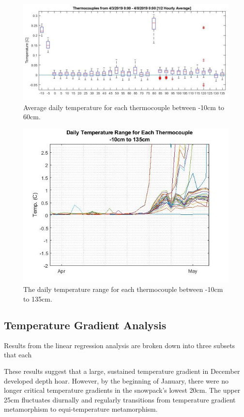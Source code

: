 \begin{figure}[H]
    \raggedleft
    \includegraphics[width=1\linewidth]{figures/Isotherm_boxplot.jpg}
    \caption{Average daily temperature for each thermocouple between -10cm to 60cm.}
    \label{fig:IsothermBoxplot}
 \end{figure}
 
 \begin{figure}[H]
    \centering
    \includegraphics[width=0.8\linewidth]{figures/DailyTempRange_Isotherm.jpg}
    \caption{The daily temperature range for each thermocouple between -10cm to 135cm.}
    \label{fig:DailyTempRange}
 \end{figure}
 
\subsection{Temperature Gradient Analysis}
Results from the linear regression analysis are broken down into three subsets that each 

These results suggest that a large, sustained temperature gradient in December developed depth hoar. However, by the beginning of January, there were no longer critical temperature gradients in the snowpack's lowest 20cm. The upper 25cm fluctuates diurnally and regularly transitions from temperature gradient metamorphism to equi-temperature metamorphism.  

